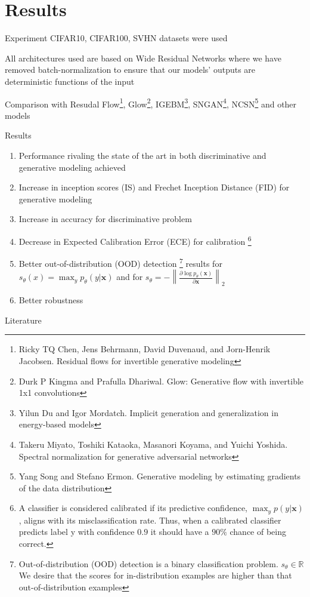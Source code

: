 \documentclass{beamer}
\newcommand\norm[1]{\left\lVert#1\right\rVert}
\begin{document}
\section{Results}
\begin{frame}{Experiment}
    CIFAR10, CIFAR100, SVHN datasets were used
    
    All architectures used are based on Wide Residual Networks where we have removed batch-normalization to ensure that our models’ outputs are deterministic functions of the input
    
    Comparison with Resudal Flow\footnote{Ricky TQ Chen, Jens Behrmann, David Duvenaud, and Jorn-Henrik Jacobsen. Residual flows for invertible generative modeling}, Glow\footnote{Durk P Kingma and Prafulla Dhariwal. Glow: Generative flow with invertible 1x1 convolutions}, IGEBM\footnote{Yilun Du and Igor Mordatch. Implicit generation and generalization in energy-based models}, SNGAN\footnote{Takeru Miyato, Toshiki Kataoka, Masanori Koyama, and Yuichi Yoshida. Spectral normalization for generative adversarial networks}, NCSN\footnote{Yang Song and Stefano Ermon. Generative modeling by estimating gradients of the data distribution} and other models
    
    
\end{frame}

\begin{frame}{Results}
    \begin{enumerate}
        \item Performance rivaling the state of the art in both discriminative and generative modeling achieved
        \item Increase in inception scores (IS) and Frechet Inception Distance (FID) for generative modeling
        \item Increase in accuracy for discriminative problem
        \item Decrease in Expected Calibration Error (ECE) for calibration \footnote{A classifier is considered calibrated if its predictive confidence, $\max_y p(y|\mathbf{x})$, aligns with its misclassification rate. Thus, when a calibrated classifier predicts label y with confidence $0.9$ it should have a $90\%$ chance of being correct.}
        \item Better out-of-distribution (OOD) detection \footnote{Out-of-distribution (OOD) detection is a binary classification problem. $s_{\theta} \in \mathbb{R}$ We desire that the scores for in-distribution examples are higher than that out-of-distribution examples} results for $s_{\theta}(x) = \max_y p_{\theta}(y|\mathbf{x})$ and for $s_{\theta} = - \norm{\frac{\partial \log p_{\theta}(\mathbf{x})}{\partial \mathbf{x}}}_2$
        \item Better robustness
    \end{enumerate}
    
\end{frame}

\begin{frame}{Literature}
\nocite{*}
\printbibliography
\end{frame}
\end{document}
